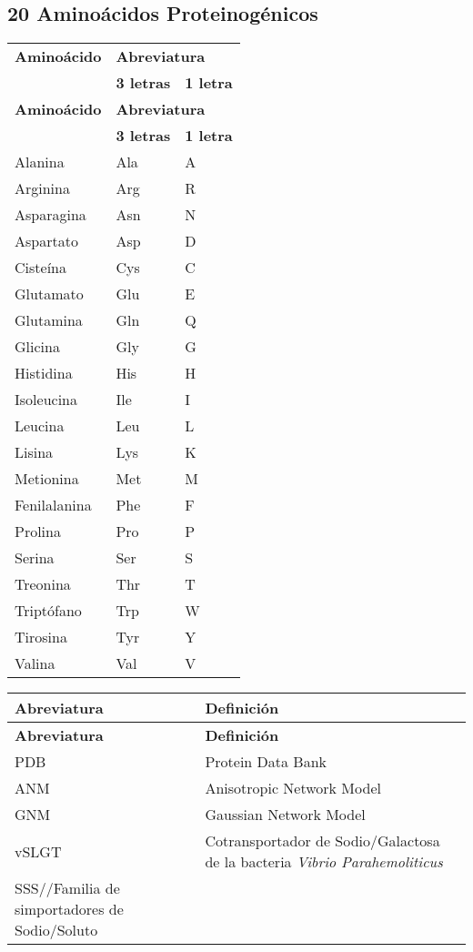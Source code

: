 \subsection*{20 Amino\'{a}cidos Proteinog\'{e}nicos} 
\begin{longtable}[l]{lll}\hline
   \textbf{Amino\'{a}cido} & \multicolumn{2}{l}{\textbf{Abreviatura}} \\
  \cline{2-3}
  &\textbf{3 letras}&\textbf{1 letra}\\[0.5ex] \hline%
  \endfirsthead%
 \textbf{Amino\'{a}cido} & \multicolumn{2}{|l|}{\textbf{Abreviatura}} \\
  \cline{2-3}
  &\textbf{3 letras}&\textbf{1 letra}\\[0.5ex] \hline%
 \endhead%
\renewcommand{\arraystretch}{1.4}\label{amino}
Alanina&Ala&A\\
Arginina&Arg&R\\
Asparagina&Asn&N\\
Aspartato&Asp&D\\
Ciste\'{i}na&Cys&C\\
Glutamato&Glu&E\\
Glutamina&Gln&Q\\
Glicina&Gly&G\\
Histidina&His&H\\
Isoleucina&Ile&I\\
Leucina&Leu&L\\
Lisina&Lys&K\\
Metionina&Met&M\\
Fenilalanina&Phe&F\\
Prolina&Pro&P\\
Serina&Ser&S\\
Treonina&Thr&T\\
Tript\'{o}fano&Trp&W\\
Tirosina&Tyr&Y\\
Valina&Val&V\\ \hline
\end{longtable}
\begin{longtable}[l]{ll}\hline
   \textbf{Abreviatura} & \textbf{Definici\'{o}n} \\
 \hline%
  \endfirsthead%
 \textbf{Abreviatura} & \textbf{Definici\'{o}n} \\
  \hline%
 \endhead%
\renewcommand{\arraystretch}{1.4}\label{abre}
PDB&Protein Data Bank\\
ANM&Anisotropic Network Model\\
GNM&Gaussian Network Model\\
vSLGT&Cotransportador de Sodio/Galactosa de la bacteria \textit{Vibrio Parahemoliticus}\\
SSS//Familia de simportadores de Sodio/Soluto\\ \hline
\end{longtable}

\setlength{\extrarowheight}{0pt}